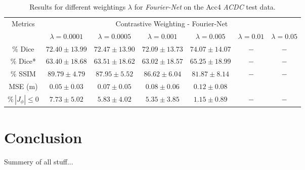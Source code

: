 \documentclass[english,version-2022-01]{uzl-thesis} %
\begin{document}
\begin{table}[h] %
	\centering
	\caption{Results for different weightings $\lambda$ for \emph{Fourier-Net} on the Acc4 \emph{ACDC} test data.}
	\label{tab:ContrastiveLossFourierNetAcc4}
	\begin{tabular}{c c c c c c c} %
		\toprule
		\multirow{2}{*}{Metrics} & \multicolumn{6}{c}{Contrastive Weighting - Fourier-Net} \\
		\cline{2-7}
		 & $\lambda=0.0001$ & $\lambda=0.0005$ & $\lambda=0.001$ & $\lambda=0.005$ & $\lambda=0.01$ & $\lambda=0.05$ \\		
		\midrule
		$\%$ Dice & $72.40 \pm 13.99$ & $72.47 \pm 13.90$ & $72.09 \pm 13.73$ & $74.07 \pm 14.07$ & $-$ & $-$ \\
		$\%$ Dice* & $63.40 \pm 18.68$ & $63.51 \pm 18.62$ & $63.02 \pm 18.57$ & $65.25 \pm 18.99$ & $-$ & $-$ \\
		$\%$ SSIM & $89.79 \pm 4.79$ & $87.95 \pm 5.52$ & $86.62 \pm 6.04$ & $81.87 \pm 8.14$ & $-$ & $-$ \\
		MSE (m) & $0.05 \pm 0.03$ & $0.07 \pm 0.05$ & $0.08 \pm 0.06$ & $0.12 \pm 0.08$ \\
		$\% \, |J_{\phi}|\leq0$ & $7.73 \pm 5.02$ & $5.83 \pm 4.02$ & $5.35 \pm 3.85$ & $1.15 \pm 0.89$ & $-$ & $-$ \\
		\bottomrule
	\end{tabular}	
\end{table}


\chapter{Conclusion} \label{Ch:Conclusion}
Summery of all stuff...
\end{document}
